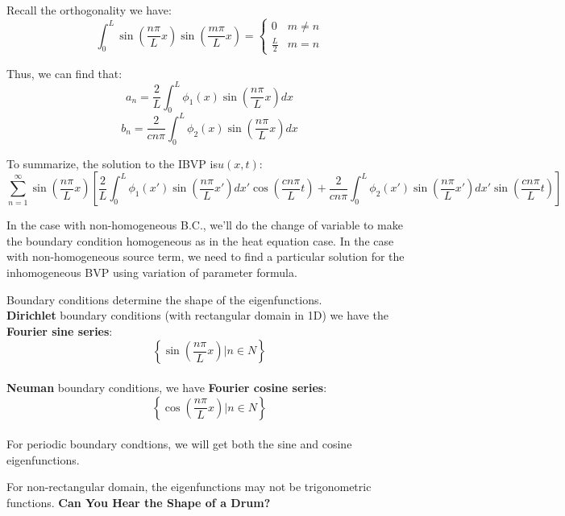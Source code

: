 \documentclass[12pt]{article} %
\begin{document}
Recall the orthogonality we have:
$$
\int_{0}^{L}\sin(\frac{n\pi}{L}x)\sin(\frac{m\pi}{L}x) = \left\{
\begin{array}{lll}
 0& m\neq n \\
\frac{L}{2} & m= n
\end{array}\right.
$$ \par
Thus, we can find that:
$$
a_{n}=\frac{2}{L}\int_{0}^{L}\phi_{1}(x)\sin(\frac{n\pi}{L}x)dx
$$
$$
b_{n}=\frac{2}{cn\pi}\int_{0}^{L}\phi_{2}(x)\sin(\frac{n\pi}{L}x)dx
$$\par
To summarize, the solution to the IBVP is$u(x, t)$:
$$
\sum_{n=1}^{\infty}\sin(\frac{n\pi}{L}x)\left[\frac{2}{L}\int_{0}^{L}\phi_{1}(x')\sin(\frac{n\pi}{L}x')dx'\cos(\frac{cn\pi}{L}t) +
\frac{2}{cn\pi}\int_{0}^{L}\phi_{2}(x')\sin(\frac{n\pi}{L}x')dx'\sin(\frac{cn\pi}{L}t)\right]
$$\par
In the case with non-homogeneous B.C., we'll do the change of variable to make the boundary condition homogeneous as in the heat equation case. In the case with non-homogeneous source term, we need to find a particular solution for the inhomogeneous BVP using variation of parameter formula. \par
Boundary conditions determine the shape of the eigenfunctions. \\
\textbf{Dirichlet} boundary conditions (with rectangular domain in 1D) we have the \textbf{Fourier sine series}:
$$
\left\{ \sin(\frac{n\pi}{L}x) | n\in N
\right\}
$$\\
\textbf{Neuman} boundary conditions, we have \textbf{Fourier cosine series}:
$$
\left\{ \cos(\frac{n\pi}{L}x) | n\in N
\right\}
$$\\
For periodic boundary condtions, we will get both the sine and cosine eigenfunctions.\par
For non-rectangular domain, the eigenfunctions may not be trigonometric functions. \textbf{Can You Hear the Shape of a Drum?}\par
\end{document}
